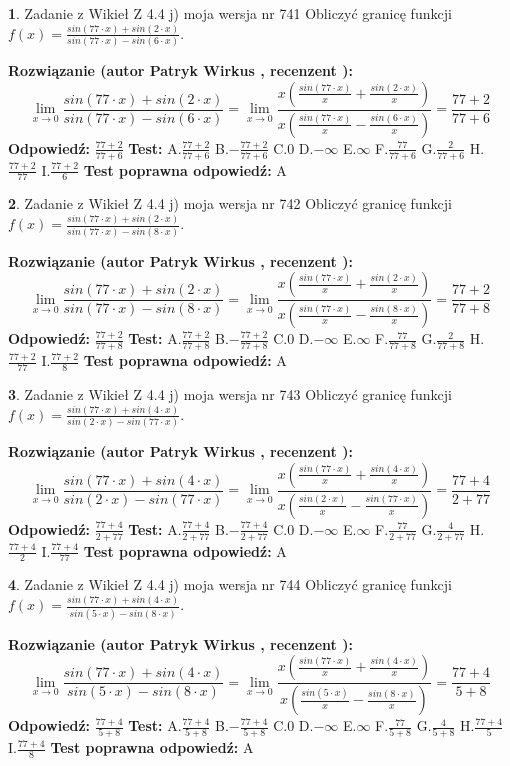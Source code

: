\documentclass[12pt, a4paper]{article}
\theoremstyle{definition} %
\newtheorem{zad}{}
\newcommand{\zadStart}[1]{\begin{zad}#1\newline}
\newcommand{\zadStop}{\end{zad}}
\newcommand{\rozwStart}[2]{\noindent \textbf{Rozwiązanie (autor #1 , recenzent #2): }\newline}
\newcommand{\rozwStop}{\newline}
\newcommand{\odpStart}{\noindent \textbf{Odpowiedź:}\newline}
\newcommand{\odpStop}{\newline}
\newcommand{\testStart}{\noindent \textbf{Test:}\newline}
\newcommand{\testStop}{\newline}
\newcommand{\kluczStart}{\noindent \textbf{Test poprawna odpowiedź:}\newline}
\newcommand{\kluczStop}{\newline}
\begin{document}
\zadStart{Zadanie z Wikieł Z 4.4 j) moja wersja nr 741}
Obliczyć granicę funkcji $f(x)=\frac{sin(77\cdot x) +sin(2\cdot x)}{sin(77\cdot x) -sin(6\cdot x)}$.
\zadStop
\rozwStart{Patryk Wirkus}{}
$$\lim\limits_{x\to 0}\frac{sin(77\cdot x) +sin(2\cdot x)}{sin(77\cdot x) -sin(6\cdot x)}=\lim\limits_{x\to 0}\frac{x(\frac{sin(77\cdot x)}{x}+\frac{sin(2\cdot x)}{x})}{x(\frac{sin(77\cdot x)}{x}-\frac{sin(6\cdot x)}{x})}=\frac{77+2}{77+6}$$
\rozwStop
\odpStart
$\frac{77+2}{77+6}$
\odpStop
\testStart
A.$\frac{77+2}{77+6}$
B.$-\frac{77+2}{77+6}$
C.$0$
D.$-\infty$
E.$\infty$
F.$\frac{77}{77+6}$
G.$\frac{2}{77+6}$
H.$\frac{77+2}{77}$
I.$\frac{77+2}{6}$
\testStop
\kluczStart
A
\kluczStop



\zadStart{Zadanie z Wikieł Z 4.4 j) moja wersja nr 742}
Obliczyć granicę funkcji $f(x)=\frac{sin(77\cdot x) +sin(2\cdot x)}{sin(77\cdot x) -sin(8\cdot x)}$.
\zadStop
\rozwStart{Patryk Wirkus}{}
$$\lim\limits_{x\to 0}\frac{sin(77\cdot x) +sin(2\cdot x)}{sin(77\cdot x) -sin(8\cdot x)}=\lim\limits_{x\to 0}\frac{x(\frac{sin(77\cdot x)}{x}+\frac{sin(2\cdot x)}{x})}{x(\frac{sin(77\cdot x)}{x}-\frac{sin(8\cdot x)}{x})}=\frac{77+2}{77+8}$$
\rozwStop
\odpStart
$\frac{77+2}{77+8}$
\odpStop
\testStart
A.$\frac{77+2}{77+8}$
B.$-\frac{77+2}{77+8}$
C.$0$
D.$-\infty$
E.$\infty$
F.$\frac{77}{77+8}$
G.$\frac{2}{77+8}$
H.$\frac{77+2}{77}$
I.$\frac{77+2}{8}$
\testStop
\kluczStart
A
\kluczStop



\zadStart{Zadanie z Wikieł Z 4.4 j) moja wersja nr 743}
Obliczyć granicę funkcji $f(x)=\frac{sin(77\cdot x) +sin(4\cdot x)}{sin(2\cdot x) -sin(77\cdot x)}$.
\zadStop
\rozwStart{Patryk Wirkus}{}
$$\lim\limits_{x\to 0}\frac{sin(77\cdot x) +sin(4\cdot x)}{sin(2\cdot x) -sin(77\cdot x)}=\lim\limits_{x\to 0}\frac{x(\frac{sin(77\cdot x)}{x}+\frac{sin(4\cdot x)}{x})}{x(\frac{sin(2\cdot x)}{x}-\frac{sin(77\cdot x)}{x})}=\frac{77+4}{2+77}$$
\rozwStop
\odpStart
$\frac{77+4}{2+77}$
\odpStop
\testStart
A.$\frac{77+4}{2+77}$
B.$-\frac{77+4}{2+77}$
C.$0$
D.$-\infty$
E.$\infty$
F.$\frac{77}{2+77}$
G.$\frac{4}{2+77}$
H.$\frac{77+4}{2}$
I.$\frac{77+4}{77}$
\testStop
\kluczStart
A
\kluczStop



\zadStart{Zadanie z Wikieł Z 4.4 j) moja wersja nr 744}
Obliczyć granicę funkcji $f(x)=\frac{sin(77\cdot x) +sin(4\cdot x)}{sin(5\cdot x) -sin(8\cdot x)}$.
\zadStop
\rozwStart{Patryk Wirkus}{}
$$\lim\limits_{x\to 0}\frac{sin(77\cdot x) +sin(4\cdot x)}{sin(5\cdot x) -sin(8\cdot x)}=\lim\limits_{x\to 0}\frac{x(\frac{sin(77\cdot x)}{x}+\frac{sin(4\cdot x)}{x})}{x(\frac{sin(5\cdot x)}{x}-\frac{sin(8\cdot x)}{x})}=\frac{77+4}{5+8}$$
\rozwStop
\odpStart
$\frac{77+4}{5+8}$
\odpStop
\testStart
A.$\frac{77+4}{5+8}$
B.$-\frac{77+4}{5+8}$
C.$0$
D.$-\infty$
E.$\infty$
F.$\frac{77}{5+8}$
G.$\frac{4}{5+8}$
H.$\frac{77+4}{5}$
I.$\frac{77+4}{8}$
\testStop
\kluczStart
A
\kluczStop
\end{document}
